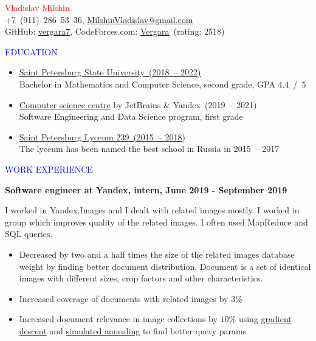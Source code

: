 \documentclass[a4paper,20pt]{report}
\begin{document}
	\thispagestyle{empty}
%	
	
	\begin{center}
		\Huge \textcolor{red}{Vladislav Milshin}\\[1mm]
		\Large +7~(911)~286~53~36, \url{MilshinVladislav@gmail.com}\\[1pt]
 		GitHub: \href{https://github.com/vergara7}{vergara7},
 		CodeForces.com: \href{https://codeforces.com/profile/Vergara}{Vergara}~(rating: 2518)
	\end{center}

	\begin{center}
		{\LARGE \textcolor{blue}{EDUCATION}}
		\Large
		\begin{itemize}
			\item \href{https://en.wikipedia.org/wiki/Saint_Petersburg_State_University}{Saint Petersburg State University~(2018~-- 2022)}\\[0pt]
			Bachelor in Mathematics and Computer Science,  
			second grade, GPA	 $4.4$~/~$5$\\[1mm]
			\item \href{https://compscicenter.ru}{Computer science centre} by JetBrains $\&$ Yandex~(2019~-- 2021)\\[0pt]
			Software Engineering and Data Science program, first grade\\[1mm]
			\item \href{https://en.wikipedia.org/wiki/Saint_Petersburg_Lyceum_239}{Saint Petersburg Lyceum 239~(2015~-- 2018)}\\
			The lyceum has been named the best school in Russia in 2015~-- 2017
		\end{itemize}
	\end{center}
	\par

	\begin{center}
		{\LARGE \textcolor{blue}{WORK EXPERIENCE}}
	\end{center}
	\Large
	\par
	\textbf{Software engineer at Yandex, intern, June 2019 - September 2019} \\[2mm]
	\par
	I worked in Yandex.Images and I dealt with related images mostly. I worked in group which improves quality of the related images. I often used MapReduce and SQL queries.
	\begin{itemize}
		\item Decreased by two and a half times the size of the related images database weight by finding better document distribution. Document is a set of identical images with different sizes, crop factors and other characteristics.		
		\item Increased coverage of documents with related images by $3\%$   
		\item Increased document relevance in image collections by $10\%$ using \href{https://en.wikipedia.org/wiki/Gradient_descent}{gradient descent} and \href{https://en.wikipedia.org/wiki/Simulated_annealing}{simulated annealing} to find better query params\vspace{1pt}
	\end{itemize}
	\par
	
\end{document}
